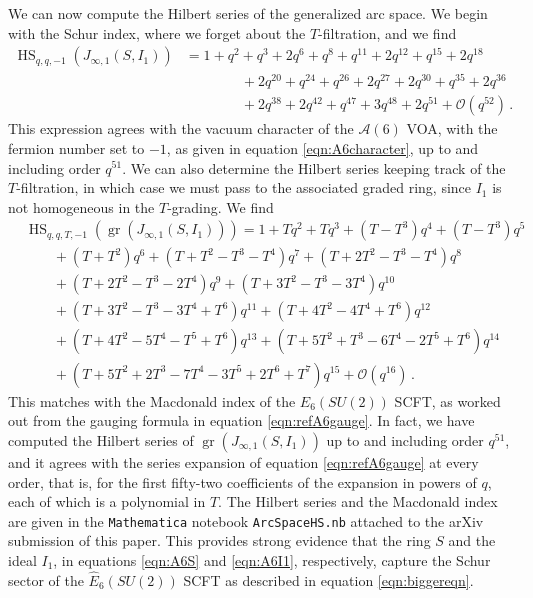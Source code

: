 \documentclass[12pt]{article}
\numberwithin{equation}{section}
\numberwithin{figure}{section}
\theoremstyle{plain}
\theoremstyle{definition}
\begin{document}
We can now compute the Hilbert series of the generalized arc space. We begin with the Schur index, where we forget about the $T$-filtration, and we find
\begin{equation} 
  \begin{aligned}
    \operatorname{HS}_{q,q,-1}(J_{\infty,1}(S, I_1)) &= 1 + q^2 + q^3 + 2 q^6 + q^8 + q^{11} + 2 q^{12} + q^{15} + 2 q^{18}  \\&\qquad\qquad+
 2 q^{20} + q^{24} + q^{26} + 2 q^{27} + 2 q^{30} + q^{35} + 2 q^{36} \\&\qquad\qquad+ 2 q^{38} + 2 q^{42} + q^{47} + 3 q^{48} + 2 q^{51} + \mathcal{O}(q^{52}) \,.
  \end{aligned}
\end{equation}
This expression agrees with the vacuum character of the $\mathcal{A}(6)$ VOA, with the fermion number set to $-1$, as given in equation \eqref{eqn:A6character}, up to and including order $q^{51}$. We can also determine the Hilbert series keeping track of the $T$-filtration, in which case we must pass to the associated graded ring, since $I_1$ is not homogeneous in the $T$-grading. We find
\begin{equation}
  \begin{aligned}
    &\operatorname{HS}_{q,q,T,-1}(\operatorname{gr}(J_{\infty,1}(S, I_1))) = 1 + T q^2 + 
 T q^3 + (T - T^3) q^4 + (T - T^3) q^5 \\&\qquad + (T + T^2) q^6 + (T + T^2 - 
    T^3 - T^4) q^7 + (T + 2 T^2 - T^3 - T^4) q^8 \\&\qquad+ (T + 
    2 T^2 - T^3 - 2 T^4 ) q^9 + (T + 3 T^2 - T^3 - 3 T^4 ) q^{10} \\&\qquad+ (T + 3 T^2 - T^3 - 3 T^4 + T^6 ) q^{11} + (T + 4 T^2 - 4 T^4 + T^6 ) q^{12} \\&\qquad+ (T + 4 T^2 - 5 T^4 - T^5 + T^6) q^{13} + (T + 5 T^2 + T^3 - 6 T^4 - 2 T^5 + T^6) q^{14} &\\&\qquad+ (T + 5 T^2 + 2T^3 - 7T^4 - 3T^5 + 2T^6 + T^7)q^{15} + \mathcal{O}(q^{16}) \,.
  \end{aligned}
\end{equation}
This matches with the Macdonald index of the $\widehat{E}_6(SU(2))$ SCFT, as worked out from the gauging formula in equation \eqref{eqn:refA6gauge}. In fact, we have computed the Hilbert series of $\operatorname{gr}(J_{\infty,1}(S, I_1))$ up to and including order $q^{51}$, and it agrees with the series expansion of equation \eqref{eqn:refA6gauge} at every order, that is, for the first fifty-two coefficients of the expansion in powers of $q$, each of which is a polynomial in $T$. The Hilbert series and the Macdonald index are given in the {\tt Mathematica} notebook {\tt ArcSpaceHS.nb} attached to the arXiv submission of this paper. This provides strong evidence that the ring $S$ and the ideal $I_1$, in equations \eqref{eqn:A6S} and \eqref{eqn:A6I1}, respectively, capture the Schur sector of the $\widehat{E}_6(SU(2))$ SCFT as described in equation \eqref{eqn:biggereqn}.
\end{document}
